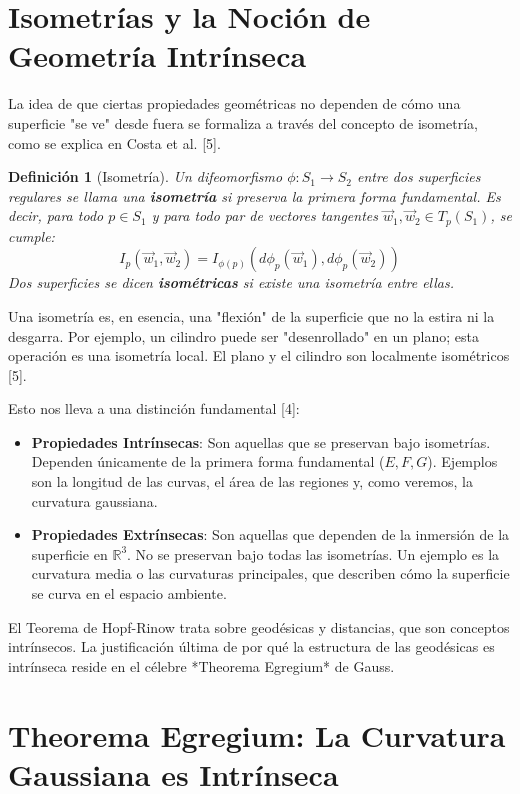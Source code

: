 \documentclass[12pt, a4paper]{report}
\theoremstyle{miestilo}
\theoremstyle{midefinicion}
\newtheorem{definicion}[teorema]{Definición}
\begin{document}
\section{Isometrías y la Noción de Geometría Intrínseca}

La idea de que ciertas propiedades geométricas no dependen de cómo una superficie "se ve" desde fuera se formaliza a través del concepto de isometría, como se explica en Costa et al. [5].

\begin{definicion}[Isometría]
Un difeomorfismo $\phi: S_1 \to S_2$ entre dos superficies regulares se llama una \textbf{isometría} si preserva la primera forma fundamental. Es decir, para todo $p \in S_1$ y para todo par de vectores tangentes $\vec{w}_1, \vec{w}_2 \in T_p(S_1)$, se cumple:
$$I_p(\vec{w}_1, \vec{w}_2) = I_{\phi(p)}(d\phi_p(\vec{w}_1), d\phi_p(\vec{w}_2))$$
Dos superficies se dicen \textbf{isométricas} si existe una isometría entre ellas.
\end{definicion}

Una isometría es, en esencia, una "flexión" de la superficie que no la estira ni la desgarra. Por ejemplo, un cilindro puede ser "desenrollado" en un plano; esta operación es una isometría local. El plano y el cilindro son localmente isométricos [5].

Esto nos lleva a una distinción fundamental [4]:
\begin{itemize}
    \item \textbf{Propiedades Intrínsecas}: Son aquellas que se preservan bajo isometrías. Dependen únicamente de la primera forma fundamental ($E, F, G$). Ejemplos son la longitud de las curvas, el área de las regiones y, como veremos, la curvatura gaussiana.
    \item \textbf{Propiedades Extrínsecas}: Son aquellas que dependen de la inmersión de la superficie en $\mathbb{R}^3$. No se preservan bajo todas las isometrías. Un ejemplo es la curvatura media o las curvaturas principales, que describen cómo la superficie se curva en el espacio ambiente.
\end{itemize}

El Teorema de Hopf-Rinow trata sobre geodésicas y distancias, que son conceptos intrínsecos. La justificación última de por qué la estructura de las geodésicas es intrínseca reside en el célebre *Theorema Egregium* de Gauss.

\section{Theorema Egregium: La Curvatura Gaussiana es Intrínseca}
\end{document}
